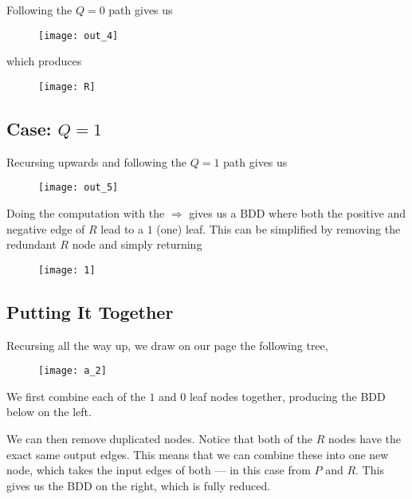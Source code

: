 \documentclass[11pt]{article}
\begin{document}
Following the $Q=0$ path gives us

\begin{figure}[H]
	\centering
	\texttt{[image: out\_4]}
\end{figure}

which produces 

\begin{figure}[H]
	\centering
	\texttt{[image: R]}
\end{figure}

\subsection{Case: $Q=1$}

Recursing upwards and following the $Q=1$ path gives us

\begin{figure}[H]
	\centering
	\texttt{[image: out\_5]}
\end{figure}

Doing the computation with the $\Rightarrow$ gives us a BDD where both the positive and negative edge of $R$ lead to a $1$ (one) leaf. This can be simplified by removing the redundant $R$ node and simply returning

\begin{figure}[H]
	\centering
	\texttt{[image: 1]}
\end{figure}

\pagebreak

\subsection{Putting It Together}

Recursing all the way up, we draw on our page the following tree,

\begin{figure}[H]
	\centering
	\texttt{[image: a\_2]}
\end{figure}

We first combine each of the $1$ and $0$ leaf nodes together, producing the BDD below on the left.

We can then remove duplicated nodes. Notice that both of the $R$ nodes have the exact same output edges. This means that we can combine these into one new node, which takes the input edges of both — in this case from $P$ and $R$. This gives us the BDD on the right, which is fully reduced.
\end{document}
